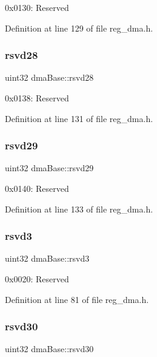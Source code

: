 0x0130\+: Reserved 

Definition at line 129 of file reg\+\_\+dma.\+h.

\mbox{\label{structdmaBase_a4650810426ecb23d0c35599c036b83b7}} 
\subsubsection{\texorpdfstring{rsvd28}{rsvd28}}
{\footnotesize\ttfamily uint32 dma\+Base\+::rsvd28}

0x0138\+: Reserved 

Definition at line 131 of file reg\+\_\+dma.\+h.

\mbox{\label{structdmaBase_a75adbc29024d96f93579ae2426c292ea}} 
\subsubsection{\texorpdfstring{rsvd29}{rsvd29}}
{\footnotesize\ttfamily uint32 dma\+Base\+::rsvd29}

0x0140\+: Reserved 

Definition at line 133 of file reg\+\_\+dma.\+h.

\mbox{\label{structdmaBase_acaf5fca5868db723b05d92787d204de4}} 
\subsubsection{\texorpdfstring{rsvd3}{rsvd3}}
{\footnotesize\ttfamily uint32 dma\+Base\+::rsvd3}

0x0020\+: Reserved 

Definition at line 81 of file reg\+\_\+dma.\+h.

\mbox{\label{structdmaBase_af8aa32c06c2047804800fad28ed3b9bb}} 
\subsubsection{\texorpdfstring{rsvd30}{rsvd30}}
{\footnotesize\ttfamily uint32 dma\+Base\+::rsvd30}

